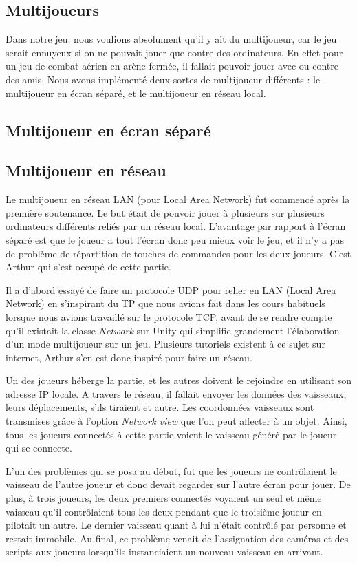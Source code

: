 \documentclass[12pt, titlepage]{article}
\begin{document}
\begin{spacing}{1.5}
\newpage
\section{Multijoueurs}

Dans notre jeu, nous voulions absolument qu'il y ait du multijoueur, car le jeu serait ennuyeux si on ne pouvait jouer que contre des ordinateurs. En effet pour un jeu de combat aérien en arène fermée, il fallait pouvoir jouer avec ou contre des amis. Nous avons implémenté deux sortes de multijoueur différents : le multijoueur en écran séparé, et le multijoueur en réseau local.

\subsection{Multijoueur en écran séparé}

\subsection{Multijoueur en réseau}

Le multijoueur en réseau LAN (pour Local Area Network) fut commencé après la première soutenance. Le but était de pouvoir jouer à plusieurs sur plusieurs ordinateurs différents reliés par un réseau local. L'avantage par rapport à l'écran séparé est que le joueur a tout l'écran donc peu mieux voir le jeu, et il n'y a pas de problème de répartition de touches de commandes pour les deux joueurs. C'est Arthur qui s'est occupé de cette partie.

Il a d'abord essayé de faire un protocole UDP pour relier en LAN (Local Area Network) en s'inspirant du TP que nous avions fait dans les cours habituels lorsque nous avions travaillé sur le protocole TCP, avant de se rendre compte qu'il existait la classe \textit{Network} sur Unity qui simplifie grandement l'élaboration d'un mode multijoueur sur un jeu. Plusieurs tutoriels existent à ce sujet sur internet, Arthur s'en est donc inspiré pour faire un réseau.

Un des joueurs héberge la partie, et les autres doivent le rejoindre en utilisant son adresse IP locale. A travers le réseau, il fallait envoyer les données des vaisseaux, leurs déplacements, s'ils tiraient et autre. Les coordonnées vaisseaux sont transmises grâce à l'option \textit{Network view} que l'on peut affecter à un objet. Ainsi, tous les joueurs connectés à cette partie voient le vaisseau généré par le joueur qui se connecte.

L'un des problèmes qui se posa au début, fut que les joueurs ne contrôlaient le vaisseau de l'autre joueur et donc devait regarder sur l'autre écran pour jouer. De plus, à trois joueurs, les deux
premiers connectés voyaient un seul et même vaisseau qu'il contrôlaient tous les deux pendant que le troisième joueur en pilotait un autre. Le dernier vaisseau quant à lui n'était contrôlé par personne et restait immobile. Au final, ce problème venait de l'assignation des caméras et des scripts aux joueurs lorsqu'ils instanciaient un nouveau vaisseau en arrivant.


\end{spacing}
\end{document}
